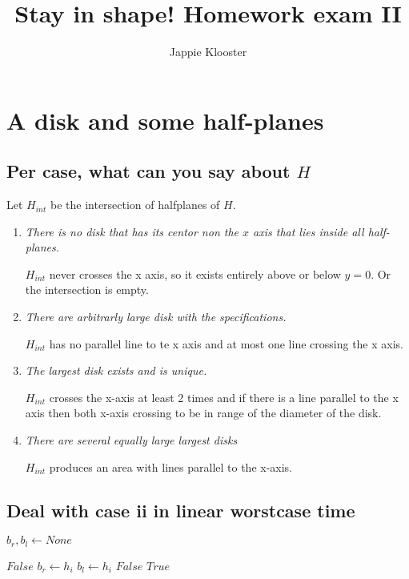 \documentclass{article}
\begin{document}
\author{Jappie Klooster}
\title{Stay in shape! Homework exam II}
\maketitle
\section{A disk and some half-planes}
\subsection{Per case, what can you say about $H$}
Let $H_{int}$ be the intersection of halfplanes of $H$.
\begin{enumerate}[i]
	\item \emph{There is no disk that has its centor non the $x$ axis
			that lies inside all half-planes.}

		$H_{int}$ never crosses the x axis,
		so it exists entirely above or below $y=0$. Or the intersection is empty.

	\item \emph{There are arbitrarly large disk with the specifications.}

		$H_{int}$ has no parallel line  to te x axis and
		at most one line crossing the x axis.

	\item \emph{The largest disk exists and is unique.}

		$H_{int}$ crosses the x-axis at least 2 times and
		if there is a line parallel to the x axis then both x-axis crossing
		to be in range of the diameter of the disk.

	\item \emph{There are several equally large largest disks}

		$H_{int}$ produces an area with lines parallel to the x-axis.

\end{enumerate}

\newpage
\subsection{Deal with case ii in linear worstcase time}
\begin{algorithmic}[1]
		\State
		$b_r, b_l \gets None$

				\State
				\Return $False$
			\EndIf
			\State
			\State
				$b_r \gets h_i$
			\EndIf
			\State
				$b_l \gets h_i$
			\EndIf
				\State
				\Return $False$
			\EndIf
		\EndFor
		\State
		\Return $True$
	\EndFunction
	\State 
	\State 
\end{algorithmic}
\end{document}
